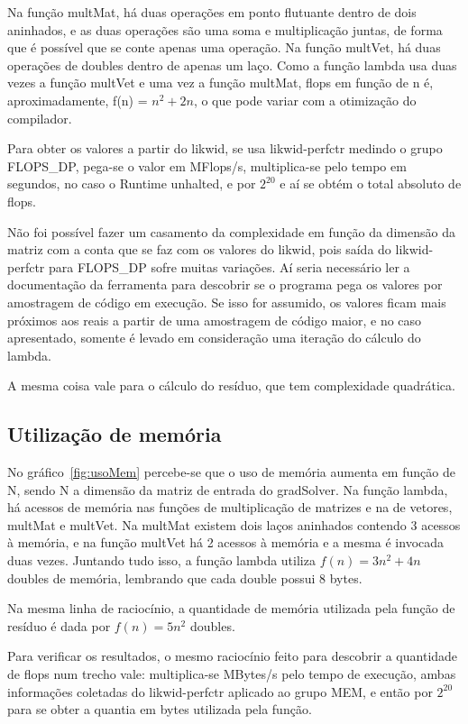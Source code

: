 \documentclass[12pt]{article}
\begin{document}
Na função multMat, há duas operações em ponto flutuante dentro de dois
aninhados, e as duas operações são uma soma e multiplicação juntas, de forma que
é possível que se conte apenas uma operação. Na função multVet, há duas
operações de doubles dentro de apenas um laço. Como a função lambda usa duas
vezes a função multVet e uma vez a função multMat, flops em função de n é,
aproximadamente, f(n) = $n^2 + 2n$, o que pode variar com a otimização do
compilador.

Para obter os valores a partir do likwid, se usa likwid-perfctr medindo o grupo
FLOPS\_DP, pega-se o valor em MFlops/s, multiplica-se pelo tempo em segundos, no
caso o Runtime unhalted, e por $2^{20}$ e aí se obtém o total absoluto de flops.

Não foi possível fazer um casamento da complexidade em função da dimensão da
matriz com a conta que se faz com os valores do likwid, pois saída do
likwid-perfctr para FLOPS\_DP sofre muitas variações. Aí seria necessário ler a
documentação da ferramenta  para descobrir se o programa pega os valores por
amostragem de código em execução. Se isso for assumido, os valores ficam mais
próximos aos reais a partir de uma amostragem de código maior, e no caso
apresentado, somente é levado em consideração uma iteração do cálculo do lambda.

A mesma coisa vale para o cálculo do resíduo, que tem complexidade quadrática.

\subsection{Utilização de memória}\label{sec:utilizacaoMemoria}

No gráfico~\ref{fig:usoMem} percebe-se que o uso de memória aumenta em função de
N, sendo N a dimensão da matriz de entrada do gradSolver. Na função lambda, há
acessos de memória nas funções de multiplicação de matrizes e na de vetores,
multMat e multVet. Na multMat existem dois laços aninhados contendo 3 acessos à
memória, e na função multVet há 2 acessos à memória e a mesma é invocada duas
vezes. Juntando tudo isso, a função lambda utiliza $f(n) = 3n^2 + 4n$ doubles de
memória, lembrando que cada double possui 8 bytes.

Na mesma linha de raciocínio, a quantidade de memória utilizada pela função de
resíduo é dada por $f(n) = 5n^2$ doubles.

Para verificar os resultados, o mesmo raciocínio feito para descobrir a
quantidade de flops num trecho vale: multiplica-se MBytes/s pelo tempo de
execução, ambas informações coletadas do likwid-perfctr aplicado ao grupo MEM, e
então por $2^{20}$ para se obter a quantia em bytes utilizada pela função.
\end{document}
